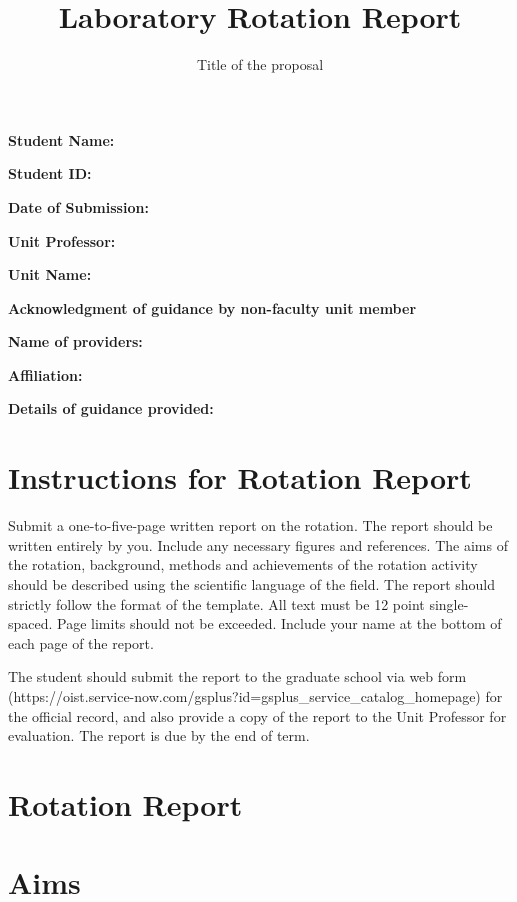 \documentclass[paper=a4wide, fontsize=12pt]{scrartcl}	 %
\title{\vspace{-1.8cm}  \color{DarkRed} Laboratory Rotation Report}
\subtitle{Title of the proposal %
\vspace{-2cm} }
\date{} %
\begin{document}
\maketitle %
\thispagestyle{fancy} %


\vspace{-0.5cm} \textbf{Student Name:}

\textbf{Student ID:}

\textbf{Date of Submission:}

\textbf{Unit Professor:}

\textbf{Unit Name:}

\vspace{3mm} \textbf{Acknowledgment of guidance by non-faculty unit member}

\textbf{Name of providers:}

\textbf{Affiliation:}

\textbf{Details of guidance provided:}


\vspace{0.5cm}

\section*{Instructions for Rotation Report}

Submit a one-to-five-page written report on the rotation. The report should be written entirely by you. Include any necessary figures and references. The aims of the rotation, background, methods and achievements of the rotation activity should be described using the scientific language of the field. 
The report should strictly follow the format of the template. All text must be 12 point single-spaced. Page limits should not be exceeded. Include your name at the bottom of each page of the report.

The student should submit the report to the graduate school via web form (https://oist.service-now.com/gsplus?id=gsplus_service_catalog_homepage) for the official record, and also provide a copy of the report to the Unit Professor for evaluation. The report is due by the end of term. 


\section*{Rotation Report}


\section*{Aims}
\end{document}
